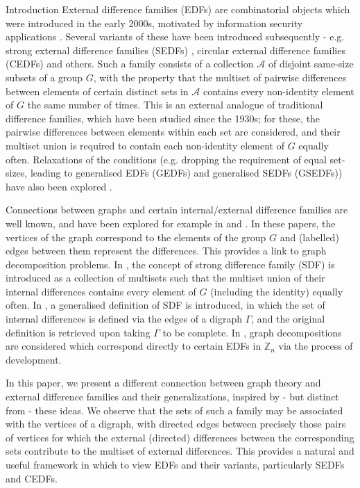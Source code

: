 \documentclass[12pt, a4paper]{article}
\theoremstyle{definition}
\begin{document}
\begin{section}{Introduction}
External difference families (EDFs) are combinatorial objects which were introduced in the early 2000s, motivated by information security applications \cite{Cramer, Oga}.  Several variants of these have been introduced subsequently - e.g. strong external difference families (SEDFs) \cite{PatSti1}, circular external difference families (CEDFs) \cite{VeiSti} and others. Such a family consists of a collection $\mathcal{A}$ of disjoint same-size subsets of a group $G$, with the property that the multiset of pairwise differences between elements of certain distinct sets in $\mathcal{A}$ contains every non-identity element of $G$ the same number of times.  This is an external analogue of traditional difference families, which have been studied since the 1930s; for these, the pairwise differences between elements within each set are considered, and their multiset union is required to contain each non-identity element of $G$ equally often. Relaxations of the conditions (e.g. dropping the requirement of equal set-sizes, leading to generalised EDFs (GEDFs) and generalised SEDFs (GSEDFs)) have also been explored \cite{PatSti1}.

Connections between graphs and certain internal/external difference families are well known, and have been explored for example in \cite{BurGio} and \cite{HucPat}. In these papers, the vertices of the graph correspond to the elements of the group $G$ and (labelled) edges between them represent the differences. This provides a link to graph decomposition problems.  In \cite{Bur}, the concept of strong difference family (SDF) is introduced as a collection of multisets such that the multiset union of their internal differences contains every element of $G$ (including the identity) equally often. In \cite{BurGio}, a generalised definition of SDF is introduced, in which the set of internal differences is defined via the edges of a digraph $\Gamma$, and the original definition is retrieved upon taking $\Gamma$ to be complete. In \cite{HucPat}, graph decompositions are considered which correspond directly to certain EDFs in $\mathbb{Z}_n$ via the process of development.

In this paper, we present a different connection between graph theory and external difference families and their generalizations, inspired by - but distinct from - these ideas.  We observe that the sets of such a family may be associated with the vertices of a digraph, with directed edges between precisely those pairs of vertices for which the external (directed) differences between the corresponding sets contribute to the multiset of external differences.  This provides a natural and useful framework in which to view EDFs and their variants, particularly SEDFs and CEDFs.


\end{section}
\end{document}
